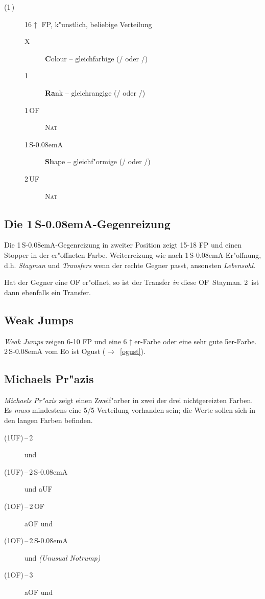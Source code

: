 \documentclass[11pt,german,twocolumn]{scrartcl}
\def\kar{\nobreak\,\Di\xspace}
\def\tre{\nobreak\,\Cl\xspace}
\def\pi{\Sp\xspace}
\def\co{\He\xspace}
\def\ka{\Di\xspace}
\def\tr{\Cl\xspace}
\def\ra{$\rightarrow$\xspace}
\def\pl{$\uparrow$\xspace}
\def\uf{\nobreak\textsf{\,UF}\xspace}
\def\of{\nobreak\textsf{\,OF}\xspace}
\def\ufa{\nobreak\textsf{UF}\xspace}
\def\aufa{\nobreak\textsf{aUF}\xspace}
\def\ofa{\nobreak\textsf{OF}\xspace}
\def\aofa{\nobreak\textsf{aOF}\xspace}
\def\sa{\nobreak\textsf{S\kern-0.08emA}\xspace}
\def\SA{\nobreak\,\sa}
\def\kontra{\textsf{X}\xspace}
\def\sep{\,--\,}
\newcommand{\conv}[1]{\emph{#1}}
\def\nat{\textsc{Nat}\xspace}
\def\eo{\textsc{E\"o}\xspace}
\def\bdsc{\begin{description}}
\def\edsc{\end{description}}
\newcommand{\Index}[1]{#1\index{#1}}
\begin{document}
\bdsc
\item[(1\tre)] 16\pl FP, k"unstlich, beliebige Verteilung
\bdsc
\item[\kontra] \textbf{C}olour -- gleichfarbige (\tr/\pi oder \ka/\co)
\item[1\kar] \textbf{Ra}nk -- gleichrangige (\tr/\ka oder \co/\pi)
\item[1\of] \nat
\item[1\SA] \textbf{Sh}ape -- gleichf"ormige (\tr/\co oder \ka/\pi)
\item[2\uf] \nat
\edsc
\edsc

\subsection{Die 1\SA-Gegenreizung}

Die 1\SA-Gegenreizung in zweiter Position zeigt 15-18 FP und einen
Stopper in der er"offneten Farbe. Weiterreizung wie nach
1\SA-Er"offnung, d.h. \conv{Stayman} und \conv{Transfers} wenn der
rechte Gegner passt, ansonsten \Index{\conv{Lebensohl}}.

Hat der Gegner eine \ofa er"offnet, so ist der Transfer \emph{in} diese \ofa\
Stayman. 2\tre ist dann ebenfalls ein Transfer.

\subsection{Weak Jumps}

\conv{Weak Jumps} zeigen 6-10 FP und eine 6\pl{}er-Farbe oder eine
sehr gute 5er-Farbe. 2\SA vom \eo ist Ogust\index{Ogust}
(\ra~\ref{ogust}).

\subsection{Michaels Pr"azis}

\conv{Michaels Pr"azis} zeigt einen Zweif"arber in zwei der drei
nichtgereizten Farben.  Es \emph{muss} mindestens eine 5/5-Verteilung
vorhanden sein; die Werte sollen sich in den langen Farben befinden.
%
\bdsc
\item[(1\ufa){}\sep2\kar] \co und \pi
\item[(1\ufa){}\sep2\SA] \co und \aufa
\item[(1\ofa){}\sep2\of] \aofa und \tr
\item[(1\ofa){}\sep2\SA] \tr und \ka \conv{(Unusual Notrump)}
\item[(1\ofa){}\sep3\tre] \aofa und \ka
\edsc
\end{document}
